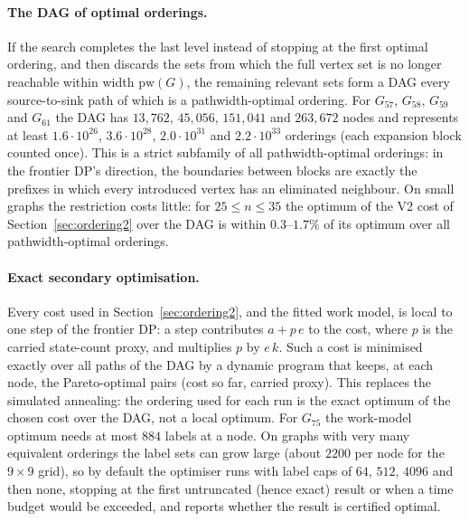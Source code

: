 \documentclass[12pt]{article}
\theoremstyle{definition}
\newcommand{\pw}{\mathrm{pw}}
\begin{document}
\paragraph{The DAG of optimal orderings.}
If the search completes the last level instead of stopping at the first
optimal ordering, and then discards the sets from which the full vertex set is
no longer reachable within width $\pw(G)$, the remaining relevant sets form a
DAG every source-to-sink path of which is a pathwidth-optimal ordering.
For $G_{57}$, $G_{58}$, $G_{59}$ and $G_{61}$ the DAG has $13{,}762$,
$45{,}056$, $151{,}041$ and $263{,}672$ nodes and represents at least
$1.6\cdot10^{26}$, $3.6\cdot10^{28}$, $2.0\cdot10^{31}$ and
$2.2\cdot10^{33}$ orderings (each expansion block counted once).
This is a strict subfamily of all pathwidth-optimal orderings: in the frontier
DP's direction, the boundaries between blocks are exactly the prefixes in
which every introduced vertex has an eliminated neighbour.
On small graphs the restriction costs little: for $25\le n\le35$ the optimum
of the V2 cost of Section~\ref{sec:ordering2} over the DAG is within
$0.3$--$1.7\%$ of its optimum over all pathwidth-optimal orderings.

\paragraph{Exact secondary optimisation.}
Every cost used in Section~\ref{sec:ordering2}, and the fitted work model,
is local to one step of the frontier DP: a step contributes $a+p\,e$ to the
cost, where $p$ is the carried state-count proxy, and multiplies $p$ by
$e\,k$.
Such a cost is minimised exactly over all paths of the DAG by a dynamic
program that keeps, at each node, the Pareto-optimal pairs (cost so far,
carried proxy).
This replaces the simulated annealing: the ordering used for each run is the
exact optimum of the chosen cost over the DAG, not a local optimum.
For $G_{75}$ the work-model optimum needs at most $884$ labels at a node.
On graphs with very many equivalent orderings the label sets can grow large
(about $2200$ per node for the $9\times9$ grid), so by default the optimiser
runs with label caps of $64$, $512$, $4096$ and then none, stopping at the
first untruncated (hence exact) result or when a time budget would be
exceeded, and reports whether the result is certified optimal.
\end{document}
